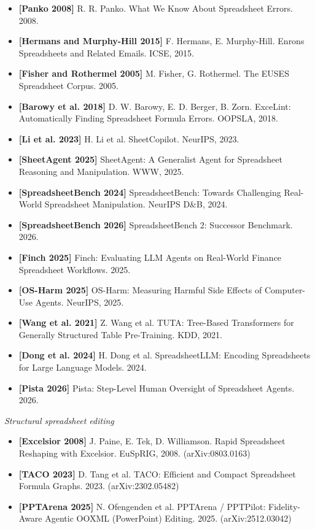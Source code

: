 \documentclass[
]{article}
\providecommand{\tightlist}{%
  \setlength{\itemsep}{0pt}\setlength{\parskip}{0pt}}
\begin{document}
\begin{itemize}
\tightlist
\item
  \textbf{{[}Panko 2008{]}} R. R. Panko. What We Know About Spreadsheet
  Errors. 2008.
\item
  \textbf{{[}Hermans and Murphy-Hill 2015{]}} F. Hermans, E.
  Murphy-Hill. Enron\textquotesingle s Spreadsheets and Related Emails.
  ICSE, 2015.
\item
  \textbf{{[}Fisher and Rothermel 2005{]}} M. Fisher, G. Rothermel. The
  EUSES Spreadsheet Corpus. 2005.
\item
  \textbf{{[}Barowy et al. 2018{]}} D. W. Barowy, E. D. Berger, B. Zorn.
  ExceLint: Automatically Finding Spreadsheet Formula Errors. OOPSLA,
  2018.
\item
  \textbf{{[}Li et al. 2023{]}} H. Li et al. SheetCopilot. NeurIPS,
  2023.
\item
  \textbf{{[}SheetAgent 2025{]}} SheetAgent: A Generalist Agent for
  Spreadsheet Reasoning and Manipulation. WWW, 2025.
\item
  \textbf{{[}SpreadsheetBench 2024{]}} SpreadsheetBench: Towards
  Challenging Real-World Spreadsheet Manipulation. NeurIPS D\&B, 2024.
\item
  \textbf{{[}SpreadsheetBench 2026{]}} SpreadsheetBench 2: Successor
  Benchmark. 2026.
\item
  \textbf{{[}Finch 2025{]}} Finch: Evaluating LLM Agents on Real-World
  Finance Spreadsheet Workflows. 2025.
\item
  \textbf{{[}OS-Harm 2025{]}} OS-Harm: Measuring Harmful Side Effects of
  Computer-Use Agents. NeurIPS, 2025.
\item
  \textbf{{[}Wang et al. 2021{]}} Z. Wang et al. TUTA: Tree-Based
  Transformers for Generally Structured Table Pre-Training. KDD, 2021.
\item
  \textbf{{[}Dong et al. 2024{]}} H. Dong et al. SpreadsheetLLM:
  Encoding Spreadsheets for Large Language Models. 2024.
\item
  \textbf{{[}Pista 2026{]}} Pista: Step-Level Human Oversight of
  Spreadsheet Agents. 2026.
\end{itemize}

\emph{Structural spreadsheet editing}

\begin{itemize}
\tightlist
\item
  \textbf{{[}Excelsior 2008{]}} J. Paine, E. Tek, D. Williamson. Rapid
  Spreadsheet Reshaping with Excelsior. EuSpRIG, 2008. (arXiv:0803.0163)
\item
  \textbf{{[}TACO 2023{]}} D. Tang et al. TACO: Efficient and Compact
  Spreadsheet Formula Graphs. 2023. (arXiv:2302.05482)
\item
  \textbf{{[}PPTArena 2025{]}} N. Ofengenden et al. PPTArena / PPTPilot:
  Fidelity-Aware Agentic OOXML (PowerPoint) Editing. 2025.
  (arXiv:2512.03042)
\end{itemize}
\end{document}
